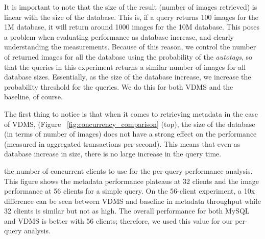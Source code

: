 It is important to note that the size of the result (number of images retrieved)
is linear with the size of the database. This is, if a query returns 100 images
for the 1M database, it will return around 1000 images for the 10M database.
This poses a problem when evaluating performance as database increase,
and clearly understanding the measurements.
Because of this reason, we control the number of returned images for all the
database using the probability of the \textit{autotags}, so that the queries
in this experiment returns a similar number of images for all database sizes.
Essentially, as the size of the database increase, we increase the probability
threshold for the queries. We do this for both VDMS and the baseline, of course.

The first thing to notice is that when it comes to retrieving metadata
in the case of VDMS, (Figure ~\ref{fig:concurrency_comparison} (top),
the size of the database (in terms of number of images) does not have
a strong effect on the performance
(measured in aggregated transactions per second).
This means that even as database increase in size, there is no large increase
in the query time.



 the number of concurrent clients to use for the per-query performance analysis.
This figure shows the metadata performance plateaus at 32 clients and
the image performance at 56 clients for a simple query.
On the 56-client experiment, a 10x difference can be seen between VDMS and
baseline in metadata throughput while 32 clients is similar but not as high.
The overall performance for both MySQL and VDMS is better with 56 clients;
therefore, we used this value for our per-query analysis.

